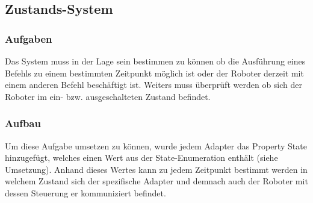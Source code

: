 
\subsection{Zustands-System}

\subsubsection{Aufgaben}
Das System muss in der Lage sein bestimmen zu können ob die Ausführung eines Befehls zu einem bestimmten Zeitpunkt möglich ist oder der Roboter derzeit mit einem anderen Befehl beschäftigt ist. Weiters muss überprüft werden ob sich der Roboter im ein- bzw. ausgeschalteten Zustand befindet.

\subsubsection{Aufbau}
Um diese Aufgabe umsetzen zu können, wurde jedem Adapter das Property State hinzugefügt, welches einen Wert aus der State-Enumeration enthält (siehe Umsetzung). Anhand dieses Wertes kann zu jedem Zeitpunkt bestimmt werden in welchem Zustand sich der spezifische Adapter und demnach auch der Roboter mit dessen Steuerung er kommuniziert befindet.

